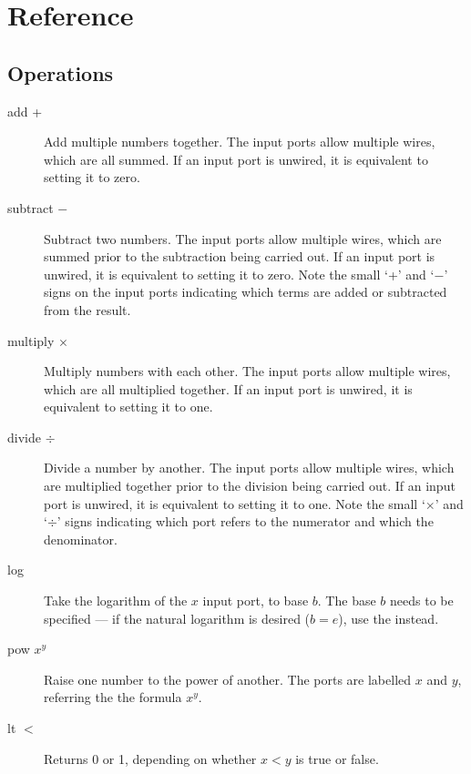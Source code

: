 \chapter{Reference}

\section{Operations}\label{operations}

\begin{description}

\item[add +]\label{Operation:add} Add multiple numbers together. The input
  ports allow multiple wires, which are all summed. If an input port
  is unwired, it is equivalent to setting it to zero.

\item[subtract $-$]\label{Operation:subtract} Subtract two numbers. The input
  ports allow multiple wires, which are summed prior to the
  subtraction being carried out. If an input port is unwired, it is
  equivalent to setting it to zero. Note the small `+' and `$-$' signs
  on the input ports indicating which terms are added or subtracted from
  the result.

\item[multiply $\times$]\label{Operation:multiply} Multiply numbers with each
  other. The input ports allow multiple wires, which are all
  multiplied together. If an input port is unwired, it is equivalent
  to setting it to one.

\item[divide $\div$]\label{Operation:divide} Divide a number by another. The
  input ports allow multiple wires, which are multiplied together
  prior to the division being carried out. If an input port is
  unwired, it is equivalent to setting it to one. Note the small
  `$\times$' and `$\div$' signs indicating which port refers to the
  numerator and which the denominator.

\item[log]\label{Operation:log} Take the logarithm of the $x$ input port, to
base $b$. The base $b$ needs to be specified --- if the natural
logarithm is desired ($b=e$), use the  instead.

\item[pow $x^y$]\label{Operation:pow} Raise one number to the power of another. The
ports are labelled $x$ and $y$, referring the the formula $x^y$.

\item[lt $<$]\label{Operation:lt} Returns 0 or 1, depending
  on whether $x<y$ is true or false.


\end{description}
